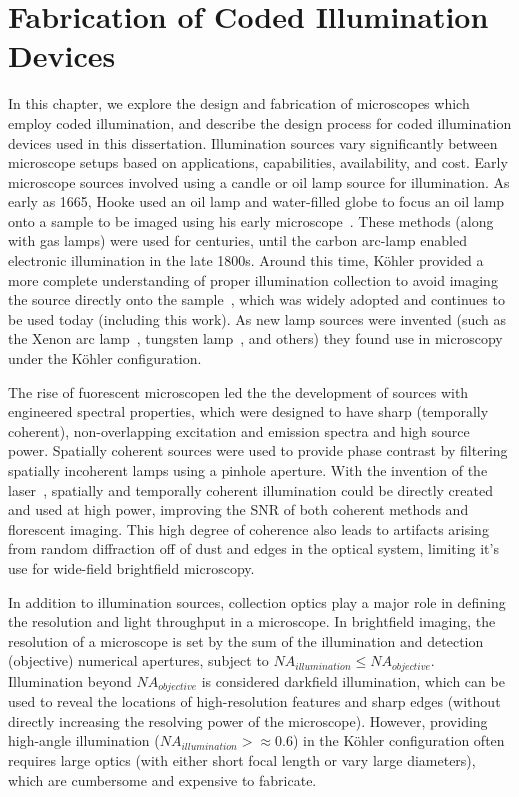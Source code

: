 \chapter{Fabrication of Coded Illumination Devices}\label{ch:fabrication}

In this chapter, we explore the design and fabrication of microscopes which employ coded illumination, and describe the design process for coded illumination devices used in this dissertation. Illumination sources vary significantly between microscope setups based on applications, capabilities, availability, and cost. Early microscope sources involved using a candle or oil lamp source for illumination. As early as 1665, Hooke used an oil lamp and water-filled globe to focus an oil lamp onto a sample to be imaged using his early microscope~\cite{hookeMicrographica}. These methods (along with gas lamps) were used for centuries, until the carbon arc-lamp enabled electronic illumination in the late 1800s. Around this time, K\"ohler provided a more complete understanding of proper illumination collection to avoid imaging the source directly onto the sample~\cite{kohler1893neues}, which was widely adopted and continues to be used today (including this work). As new lamp sources were invented (such as the Xenon arc lamp~\cite{anderson1951xenon}, tungsten lamp~\cite{edison1880electric}, and others) they found use in microscopy under the K\"ohler configuration.

The rise of fuorescent microscopen led the the development of sources with engineered spectral properties, which were designed to have sharp (temporally coherent), non-overlapping excitation and emission spectra and high source power. Spatially coherent sources were used to provide phase contrast \cite{smithDIC, zernike1942phase} by filtering spatially incoherent lamps using a pinhole aperture. With the invention of the laser~\cite{schawlow1958infrared}, spatially and temporally coherent illumination could be directly created and used at high power, improving the SNR of both coherent methods and florescent imaging. This high degree of coherence also leads to artifacts arising from random diffraction off of dust and edges in the optical system, limiting it's use for wide-field brightfield microscopy.

In addition to illumination sources, collection optics play a major role in defining the resolution and light throughput in a microscope. In brightfield imaging, the resolution of a microscope is set by the sum of the illumination and detection (objective) numerical apertures, subject to $NA_{illumination} \leq NA_{objective}$. Illumination beyond $NA_{objective}$ is considered darkfield illumination, which can be used to reveal the locations of high-resolution features and sharp edges (without directly increasing the resolving power of the microscope). However, providing high-angle illumination ($NA_{illumination} >\approx 0.6$) in the K\"ohler configuration often requires large optics (with either short focal length or vary large diameters), which are cumbersome and expensive to fabricate.

